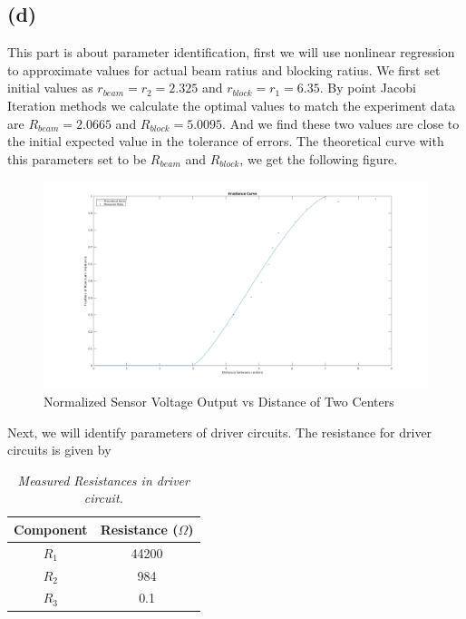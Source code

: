 \documentclass[letterpaper]{article}
\begin{document}
\subsection*{(d)}
This part is about parameter identification, first we will use nonlinear regression to approximate values for actual beam ratius and blocking ratius. We first set initial values as $r_{beam} = r_2 = 2.325$ and $r_{block} = r_1 = 6.35$. By point Jacobi Iteration methods we calculate the optimal values to match the experiment data are $R_{beam} = 2.0665$ and $R_{block} = 5.0095$. And we find these two values are close to the initial expected value in the tolerance of errors. The theoretical curve with this parameters set to be $R_{beam}$ and $R_{block}$, we get the following figure.
\begin{figure}[H]
	\centering
	\includegraphics[scale=0.25]{parameterID/beam_block.png}
	\caption{Normalized Sensor Voltage Output vs Distance of Two Centers}
\end{figure}
Next, we will identify parameters of driver circuits. The resistance for driver circuits is given by
\begin{table}[H]
\begin{center}
    \begin{tabular}{|c|c|}
        \hline
        Component & Resistance ($\Omega$) \\ \hline
        $R_{1}$   & 44200                 \\ 
        $R_{2}$   & 984                   \\ 
        $R_{3}$   & 0.1                   \\
        \hline
    \end{tabular}
\caption{\emph{Measured Resistances in driver circuit.}}
\label{Q1_dt3}
\end{center}
\end{table}
\end{document}
